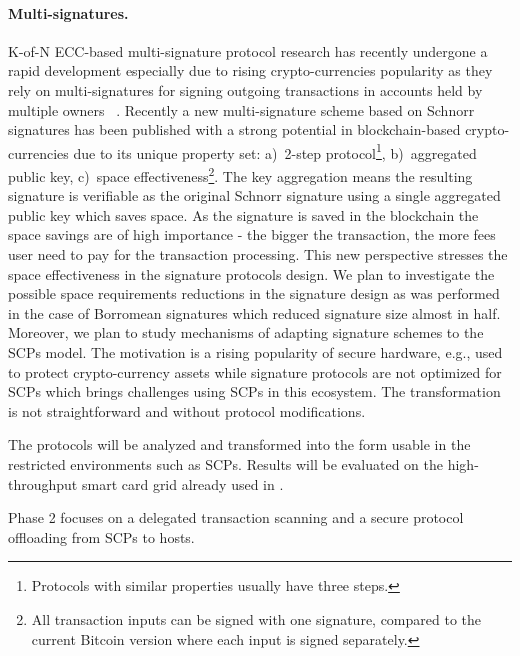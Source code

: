 \documentclass[
  digital, %
  twoside, %
  table,   %
  lof,     %
  lot,     %
]{fithesis3}
\theoremstyle{definition}
\theoremstyle{remark}
\begin{document}
\begin{ecmmnt}
\paragraph{Multi-signatures.} K-of-N ECC-based multi-signature protocol research has recently undergone a rapid development especially due to rising crypto-currencies popularity as they rely on multi-signatures for signing outgoing transactions in accounts held by multiple owners ~\cite{Bellare:2006:MPP:1180405.1180453, Bellare:2007:UAS:2394539.2394589, 10.1007/3-540-36288-6_3, cryptoeprint:2015:996, Bnz2017BulletproofsSP, cryptoeprint:2018:068}.
Recently a new multi-signature scheme \cite{cryptoeprint:2018:068} based on Schnorr signatures \cite{schnor-10.1007/3-540-46885-4_68} has been published with a strong potential in blockchain-based crypto-currencies due to its unique property set: 
a)~2-step protocol\footnote{Protocols with similar properties usually have three steps.}, b)~aggregated public key, c)~space effectiveness\footnote{All transaction inputs can be signed with one signature, compared to the current Bitcoin version where each input is signed separately.}. 
The key aggregation means the resulting signature is verifiable as the original Schnorr signature using a single aggregated public key which saves space. As the signature is saved in the blockchain the space savings are of high importance - the bigger the transaction, the more fees user need to pay for the transaction processing. This new perspective stresses the space effectiveness in the signature protocols design. We plan to investigate the possible space requirements reductions in the signature design as was performed in the case of Borromean signatures \cite{borromean} which reduced signature size almost in half. Moreover, we plan to study mechanisms of adapting signature schemes to the SCPs model. The motivation is a rising popularity of secure hardware, e.g., used to protect crypto-currency assets while signature protocols are not optimized for SCPs which brings challenges using SCPs in this ecosystem. The transformation is not straightforward and without protocol modifications.


The protocols will be analyzed and transformed into the form usable in the restricted environments such as SCPs. Results will be evaluated on the high-throughput smart card grid already used in \cite{2017-ccs-mavroudis}. 


Phase 2 focuses on a delegated transaction scanning and a secure protocol offloading from SCPs to hosts.
 

\end{ecmmnt}
\end{document}
